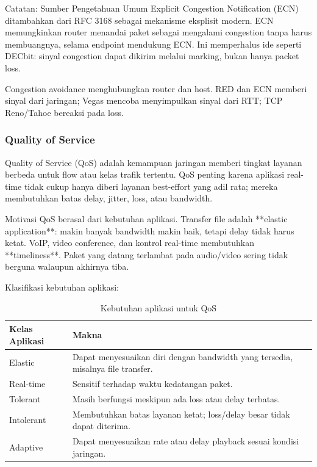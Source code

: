 \begin{cmt}{Catatan: Sumber Pengetahuan Umum}{}
Explicit Congestion Notification (ECN) ditambahkan dari RFC 3168 sebagai mekanisme eksplisit modern. ECN memungkinkan router menandai paket sebagai mengalami congestion tanpa harus membuangnya, selama endpoint mendukung ECN. Ini memperhalus ide seperti DECbit: sinyal congestion dapat dikirim melalui marking, bukan hanya packet loss.
\end{cmt}

Congestion avoidance menghubungkan router dan host. RED dan ECN memberi sinyal dari jaringan; Vegas mencoba menyimpulkan sinyal dari RTT; TCP Reno/Tahoe bereaksi pada loss.

\subsubsection{Quality of Service}
\begin{jawab}
Quality of Service (QoS) adalah kemampuan jaringan memberi tingkat layanan berbeda untuk flow atau kelas trafik tertentu. QoS penting karena aplikasi real-time tidak cukup hanya diberi layanan best-effort yang adil rata; mereka membutuhkan batas delay, jitter, loss, atau bandwidth.
\end{jawab}

Motivasi QoS berasal dari kebutuhan aplikasi. Transfer file adalah **elastic application**: makin banyak bandwidth makin baik, tetapi delay tidak harus ketat. VoIP, video conference, dan kontrol real-time membutuhkan **timeliness**. Paket yang datang terlambat pada audio/video sering tidak berguna walaupun akhirnya tiba.

Klasifikasi kebutuhan aplikasi:
\begin{table}[H]
\centering
\begin{tabularx}{\textwidth}{|L{0.26\textwidth}|X|}
\hline
\textbf{Kelas Aplikasi} & \textbf{Makna} \\
\hline
Elastic & Dapat menyesuaikan diri dengan bandwidth yang tersedia, misalnya file transfer. \\
\hline
Real-time & Sensitif terhadap waktu kedatangan paket. \\
\hline
Tolerant & Masih berfungsi meskipun ada loss atau delay terbatas. \\
\hline
Intolerant & Membutuhkan batas layanan ketat; loss/delay besar tidak dapat diterima. \\
\hline
Adaptive & Dapat menyesuaikan rate atau delay playback sesuai kondisi jaringan. \\
\hline
\end{tabularx}
\caption{Kebutuhan aplikasi untuk QoS}
\label{tab:qos-application-requirements}
\end{table}

